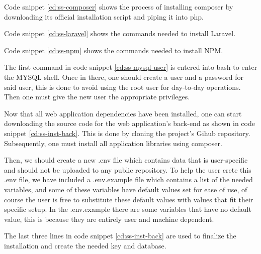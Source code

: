 Code snippet \ref{cd:ss-composer} shows the process of installing composer by downloading its official installation script and piping it into php.


Code snippet \ref{cd:ss-laravel} shows the commands needed to install Laravel.


Code snippet \ref{cd:ss-npm} shows the commands needed to install NPM.


The first command in code snippet \ref{cd:ss-mysql-user} is entered into bash to enter the MYSQL shell. Once in there, one should create a user and a password for said user, this is done to avoid using the root user for day-to-day operations. Then one must give the new user the appropriate privileges.


Now that all web application dependencies have been installed, one can start downloading the source code for the web application's back-end as shown in code snippet \ref{cd:ss-inst-back}. This is done by cloning the project's Gihub repository. Subsequently, one must install all application libraries using composer.

Then, we should create a new .env file which contains data that is user-specific and should not be uploaded to any public repository. To help the user crete this .env file, we have included a .env.example file which contains a list of the needed variables, and some of these variables have default values set for ease of use, of course the user is free to substitute these default values with values that fit their specific setup. In the .env.example there are some variables that have no default value, this is because they are entirely user and machine dependent.

The last three lines in code snippet \ref{cd:ss-inst-back} are used to finalize the installation and create the needed key and database.


